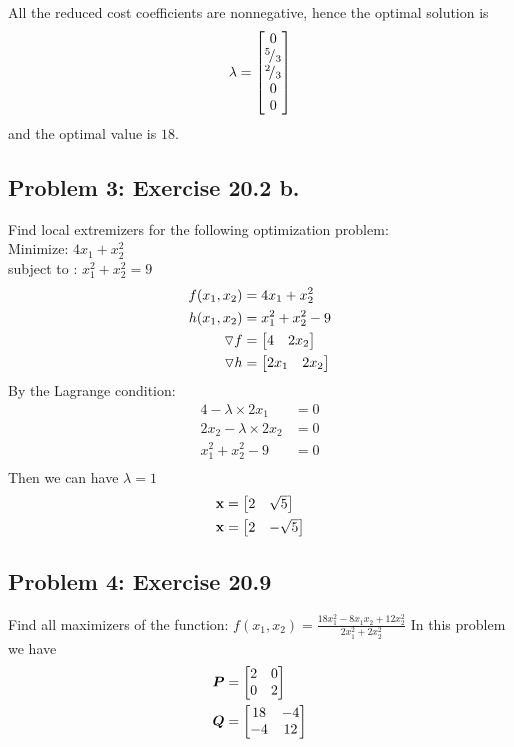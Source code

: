 \documentclass{article}
\newcommand*\rfrac[2]{{}^{#1}\!/_{#2}}
\begin{document}
All the reduced cost coefficients are nonnegative, hence the optimal solution is \begin{align*} 
\lambda = \bmat{0 \\ \rfrac{5}{3} \\ \rfrac{2}{3} \\ 0\\ 0}  \end{align*} 
and the optimal value is $18$. 








\hypertarget{}{}
\subsection*{{Problem 3: Exercise 20.2 b. }}
\label{}
 Find  local extremizers for the following optimization problem: \\
 Minimize:  $ 4x_1 + x_2^2 $   \\
 subject to :  $ x_1^2 + x_2^2  = 9 $\\
 
\begin{align*} 
f(x_1,x_2)  & = 4x_1 + x_2^2 \\
h(x_1, x_2) & = x_1^2 + x_2^2 - 9 \\ 
\triangledown f  & = \begin{bmatrix}  4 &  2x_2 \end{bmatrix}  \\
\triangledown h & = \begin{bmatrix} 2x_1 & 2x_2  \end{bmatrix} \\
\end{align*} 
By the Lagrange condition:  \begin{align*} 
4-\lambda\times 2 x_1 & = 0 \\
2x_2 -\lambda\times 2 x_2 & = 0 \\
x_1^2 + x_2^2 - 9 & = 0 \\ 
\end{align*} 
Then we can have $\lambda = 1 $ \\
\begin{align*} 
\boldsymbol{\mathrm{x}} &= \begin{bmatrix} 2 & \sqrt{5}  \end{bmatrix} \\
\boldsymbol{\mathrm{x}} &= \begin{bmatrix} 2 & -\sqrt{5}  \end{bmatrix} 
\end{align*} 

\hypertarget{}{}
\subsection*{{Problem 4: Exercise 20.9}}
\label{}
Find all maximizers of the function: $f(x_1, x_2) = \frac{18x_1^2-8x_1x_2 + 12x_2^2}{2x_1^2 + 2x_2^2 } $ 
In this problem we have 
\begin{align*} 
\boldsymbol{P} & = \begin{bmatrix}  2 & 0 \\ 0 & 2  \end{bmatrix}  \\
\boldsymbol{Q} & = \begin{bmatrix} 18 & -4 \\ -4 & 12 \end{bmatrix} \\
\end{align*} 
\end{document}
